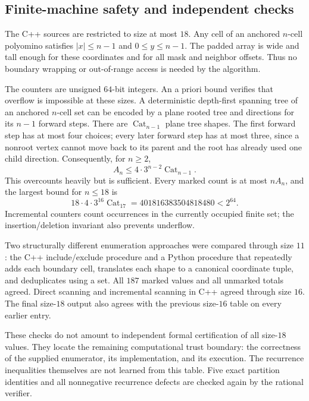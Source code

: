 \documentclass[11pt,a4paper]{article}
\theoremstyle{definition}
\theoremstyle{remark}
\begin{document}
\subsection{Finite-machine safety and independent checks}
The C++ sources are restricted to size at most $18$. Any cell of an anchored
$n$-cell polyomino satisfies $|x|\leq n-1$ and $0\leq y\leq n-1$.
The padded array is wide and tall enough for these coordinates and for all
mask and neighbor offsets. Thus no boundary wrapping or out-of-range
access is needed by the algorithm.

The counters are unsigned $64$-bit integers. An a priori bound verifies that
overflow is impossible at these sizes. A deterministic depth-first spanning
tree of an anchored $n$-cell set can be encoded by a plane rooted tree and
directions for its $n-1$ forward steps. There are
$\operatorname{Cat}_{n-1}$ plane tree shapes. The first forward step has at
most four choices; every later forward step has at most three, since a
nonroot vertex cannot move back to its parent and the root has already used
one child direction. Consequently, for $n\geq2$,
\[
 A_n\leq4\cdot3^{n-2}\operatorname{Cat}_{n-1}.
\]
This overcounts heavily but is sufficient. Every marked count is at most
$nA_n$, and the largest bound for $n\leq18$ is
\[
 18\cdot4\cdot3^{16}\operatorname{Cat}_{17}
 =401816383504818480<2^{64}.
\]
Incremental counters count occurrences in the currently occupied finite set;
the insertion/deletion invariant also prevents underflow.

Two structurally different enumeration approaches were compared through size
$11$: the C++ include/exclude procedure and a Python procedure that repeatedly
adds each boundary cell, translates each shape to a canonical coordinate
tuple, and deduplicates using a set. All $187$ marked values and all unmarked
totals agreed. Direct scanning and incremental scanning in C++ agreed through
size $16$. The final size-$18$ output also agrees with the previous
size-$16$ table on every earlier entry.

These checks do not amount to independent formal certification of all
size-$18$ values. They locate the remaining computational trust boundary:
the correctness of the supplied enumerator, its implementation, and its
execution. The recurrence inequalities themselves are not learned from this
table. Five exact partition identities and all nonnegative recurrence defects
are checked again by the rational verifier.
\end{document}
